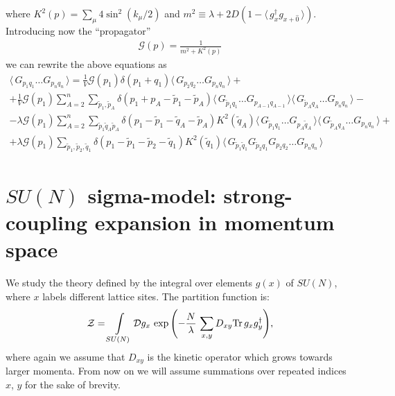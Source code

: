 \documentclass[twocolumn,showpacs,preprintnumbers,superscriptaddress,amsmath,floatfix,amssymb,secnumarabic]{revtex4}
\newcommand{\lr}[1]{ \left( #1 \right) }
\newcommand{\vev}[1]{ \langle \, #1 \, \rangle }
\newcommand{\tr}{ {\rm Tr} \, }
\newcommand{\expa}[1]{ \exp{\left( #1 \right)} }
\begin{document}
\begin{widetext}
where $K^2\lr{p} = \sum\limits_{\mu} 4 \sin^2\lr{k_{\mu}/2}$ and $m^2 \equiv \lambda + 2 D\lr{1 - \vev{g^{\dag}_x g_{x + \hat{0}}}}$. Introducing now the ``propagator''
\begin{eqnarray}
\label{propagator_def}
 \mathcal{G}\lr{p} = \frac{1}{m^2 + K^2\lr{p}}
\end{eqnarray}
we can rewrite the above equations as
\begin{eqnarray}
\label{sd_G_general_kappa_momentum}
 \vev{ G_{p_1 q_1} \ldots G_{p_n q_n} }
 =
  \frac{1}{V} \mathcal{G}\lr{p_1} \delta\lr{p_1 + q_1} \vev{G_{p_2 q_2} \ldots G_{p_n q_n}}
 + \nonumber \\ +
 \frac{1}{V} \mathcal{G}\lr{p_1} \sum\limits_{A=2}^{n} \sum\limits_{\tilde{p}_1, \tilde{p}_A} \delta\lr{p_1 + p_A - \tilde{p}_1 - \tilde{p}_A} \vev{G_{\tilde{p}_1 q_1} \ldots G_{p_{A-1} q_{A-1}}} \vev{G_{\tilde{p}_A q_A} \ldots G_{p_n q_n}}
 - \nonumber \\ -
 \lambda \mathcal{G}\lr{p_1} \sum\limits_{A=2}^{n}
 \sum\limits_{\tilde{p}_1 \tilde{q}_A \tilde{p}_A}
 \delta\lr{p_1 - \tilde{p}_1 - \tilde{q}_A - \tilde{p}_A}
 K^2\lr{\tilde{q}_A}
 \vev{G_{\tilde{p}_1 q_1} \ldots G_{p_{A} \tilde{q}_A}} \vev{G_{\tilde{p}_A q_A} \ldots G_{p_n q_n}}
 + \nonumber \\ +
 \lambda \mathcal{G}\lr{p_1} \sum\limits_{\tilde{p}_1, \tilde{p}_2, \tilde{q}_1}
 \delta\lr{p_1 - \tilde{p}_1 - \tilde{p}_2 - \tilde{q}_1} K^2\lr{\tilde{q}_1} \vev{G_{\tilde{p}_1 \tilde{q}_1} G_{\tilde{p}_2 q_1} G_{p_2 q_2} \ldots G_{p_n q_n}}
\end{eqnarray}
\end{widetext}


\section*{$SU\lr{N}$ sigma-model: strong-coupling expansion in momentum space}
\label{sec:introduction}

 We study the theory defined by the integral over elements $g\lr{x}$ of $SU\lr{N}$, where $x$ labels different lattice sites. The partition function is:
\begin{eqnarray}
\label{pf_def}
\mathcal{Z} = \int\limits_{SU\lr{N}} \mathcal{D} g_x \,
\expa{-\frac{N}{\lambda}\, \sum \limits_{x,y} D_{xy} \tr g_x g^{\dag}_y } ,
\end{eqnarray}
where again we assume that $D_{xy}$ is the kinetic operator which grows towards larger momenta. From now on we will assume summations over repeated indices $x$, $y$ for the sake of brevity.
\end{document}

